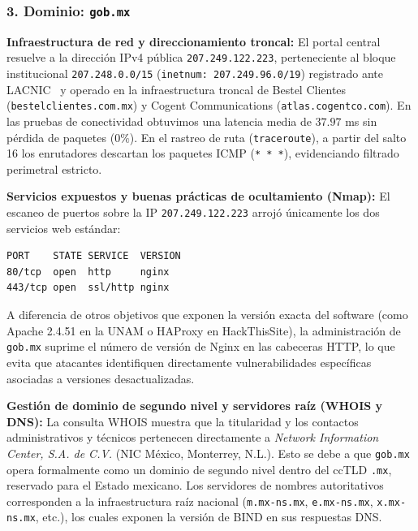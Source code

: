 \subsubsection*{3. Dominio: \texttt{gob.mx}}

\begin{itemizeColor}
    \item \textbf{Infraestructura de red y direccionamiento troncal:}
	    El portal central resuelve a la dirección IPv4 pública \texttt{207.249.122.223}, perteneciente al bloque institucional \texttt{207.248.0.0/15} (\texttt{inetnum: 207.249.96.0/19}) registrado ante LACNIC~\cite{lacnic} y operado en la infraestructura troncal de Bestel Clientes (\texttt{bestelclientes.com.mx}) y Cogent Communications (\texttt{atlas.cogentco.com}). En las pruebas de conectividad obtuvimos una latencia media de $37.97$ ms sin pérdida de paquetes ($0\%$). En el rastreo de ruta (\texttt{traceroute}), a partir del salto 16 los enrutadores descartan los paquetes ICMP (\texttt{* * *}), evidenciando filtrado perimetral estricto.

    \item \textbf{Servicios expuestos y buenas prácticas de ocultamiento (Nmap):}
    El escaneo de puertos sobre la IP \texttt{207.249.122.223} arrojó únicamente los dos servicios web estándar:
\begin{lstlisting}
PORT    STATE SERVICE  VERSION
80/tcp  open  http     nginx
443/tcp open  ssl/http nginx
\end{lstlisting}
    A diferencia de otros objetivos que exponen la versión exacta del software (como Apache 2.4.51 en la UNAM o HAProxy en HackThisSite), la administración de \texttt{gob.mx} suprime el número de versión de Nginx en las cabeceras HTTP, lo que evita que atacantes identifiquen directamente vulnerabilidades específicas asociadas a versiones desactualizadas.

    \item \textbf{Gestión de dominio de segundo nivel y servidores raíz (WHOIS y DNS):}
    La consulta WHOIS muestra que la titularidad y los contactos administrativos y técnicos pertenecen directamente a \textit{Network Information Center, S.A. de C.V.} (NIC México, Monterrey, N.L.). Esto se debe a que \texttt{gob.mx} opera formalmente como un dominio de segundo nivel dentro del ccTLD \texttt{.mx}, reservado para el Estado mexicano. Los servidores de nombres autoritativos corresponden a la infraestructura raíz nacional (\texttt{m.mx-ns.mx}, \texttt{e.mx-ns.mx}, \texttt{x.mx-ns.mx}, etc.), los cuales exponen la versión de BIND en sus respuestas DNS.


\end{itemizeColor}

